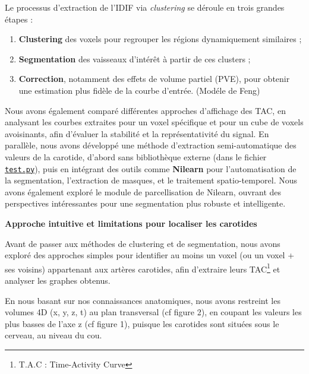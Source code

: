 \documentclass[a4paper]{article}
\begin{document}
            Le processus d'extraction de l'IDIF via \textit{clustering} se déroule en trois grandes étapes :
            
            \begin{enumerate}
                \item \textbf{Clustering} des voxels pour regrouper les régions dynamiquement similaires ;
                \item \textbf{Segmentation} des vaisseaux d’intérêt à partir de ces clusters ;
                \item \textbf{Correction}, notamment des effets de volume partiel (PVE), pour obtenir une estimation plus fidèle de la courbe d’entrée. (Modéle de Feng)\\
            \end{enumerate}
            
            \noindent
            Nous avons également comparé différentes approches d’affichage des TAC, en analysant les courbes extraites pour un voxel spécifique et pour un cube de voxels avoisinants, afin d’évaluer la stabilité et la représentativité du signal. En parallèle, nous avons développé une méthode d’extraction semi-automatique des valeurs de la carotide, d’abord sans bibliothèque externe (dans le fichier \href{run:./Pistes_et_Tests/autres_tests/test.py}{\texttt{test.py}}), puis en intégrant des outils comme \textbf{Nilearn} pour l’automatisation de la segmentation, l’extraction de masques, et le traitement spatio-temporel. Nous avons également exploré le module de parcellisation de Nilearn, ouvrant des perspectives intéressantes pour une segmentation plus robuste et intelligente. \\
\newpage
        \item \textbf{Approche intuitive et limitations pour localiser les carotides}
    
            Avant de passer aux méthodes de clustering et de segmentation, nous avons exploré des approches simples pour identifier au moins un voxel (ou un voxel + ses voisins) appartenant aux artères carotides, afin d’extraire leurs TAC\footnote{T.A.C : Time-Activity Curve} et analyser les graphes obtenus.
    
            En nous basant sur nos connaissances anatomiques, nous avons restreint les volumes 4D (x, y, z, t) au plan transversal (cf figure 2), en coupant les valeurs les plus basses de l’axe z (cf figure 1), puisque les carotides sont situées sous le cerveau, au niveau du cou.
    
            \vspace{0.5cm}
\end{document}
